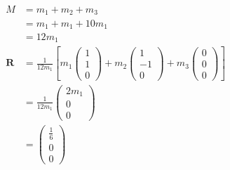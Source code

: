 \documentclass{article}
\renewcommand{\vec}[1]{\boldsymbol{\mathbf{#1}}}
\begin{document}
\begin{align*}
  M       & = m_1 + m_2 + m_3                                                                           \\
          & = m_1 + m_1 + 10 m_1                                                                        \\
          & = 12 m_1                                                                                    \\
  \vec{R} & = \frac{1}{12 m_1} \left[ m_1 \begin{pmatrix}
                                              1 \\
                                              1 \\
                                              0
                                            \end{pmatrix} + m_2 \begin{pmatrix}
                                                                  1  \\
                                                                  -1 \\
                                                                  0
                                                                \end{pmatrix} + m_3 \begin{pmatrix}
                                                                                      0 \\
                                                                                      0 \\
                                                                                      0
                                                                                    \end{pmatrix} \right] \\
          & = \frac{1}{12 m_1} \begin{pmatrix}
                                 2 m_1 \\
                                 0     \\
                                 0
                               \end{pmatrix}                                                           \\
          & = \begin{pmatrix}
                \frac{1}{6} \\
                0           \\
                0
              \end{pmatrix}
\end{align*}
\end{document}
